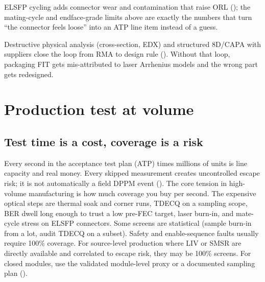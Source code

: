 ELSFP cycling adds connector wear and contamination that raise ORL
(); the mating-cycle and endface-grade limits
above are exactly the numbers that turn ``the connector feels loose'' into an ATP
line item instead of a guess.

Destructive physical analysis (cross-section, EDX) and structured 8D/CAPA with
suppliers close the loop from RMA to design rule
(). Without that loop, packaging FIT gets
mis-attributed to laser Arrhenius models and the wrong part gets redesigned.

\section{Production test at volume}
\label{sec:hvm-test}


\subsection{Test time is a cost, coverage is a risk}

Every second in the acceptance test plan (ATP) times millions of units is line
capacity and real money. Every skipped measurement creates uncontrolled escape
risk; it is not automatically a field DPPM event (). The core
tension in high-volume manufacturing is how much coverage you buy per second. The
expensive optical steps are thermal soak and corner runs, TDECQ on a sampling
scope, BER dwell long enough to trust a low pre-FEC target, laser burn-in, and
mate-cycle stress on ELSFP connectors. Some screens are statistical (sample
burn-in from a lot, audit TDECQ on a subset). Safety and enable-sequence faults
usually require 100\% coverage. For source-level production where LIV or SMSR
are directly available and correlated to escape risk, they may be 100\% screens.
For closed modules, use the validated module-level proxy or a documented sampling
plan ().


